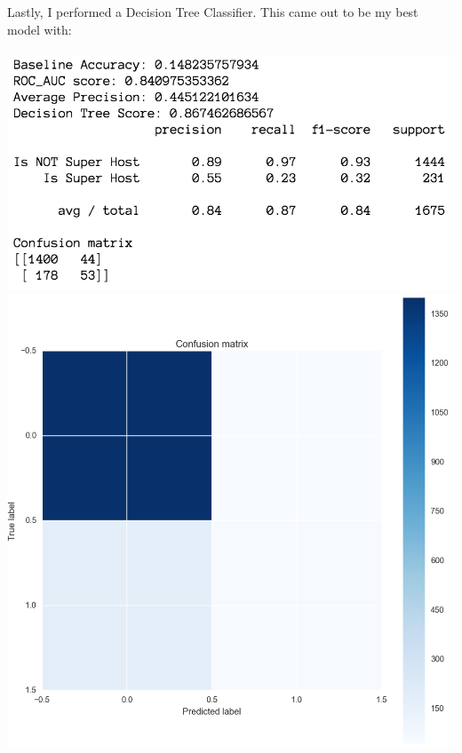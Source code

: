 \documentclass[10pt,letterpapter]{article}
\begin{document}
\begin{paragraph}
\\ \\
\indent \indent Lastly, I performed a Decision Tree Classifier. This came out to be my best model with:
\\ \\
\includegraphics[scale=0.65]{dtcscores.png} \\
\includegraphics[scale=0.30]{dtccm.png} 

\end{paragraph}
\end{document}
